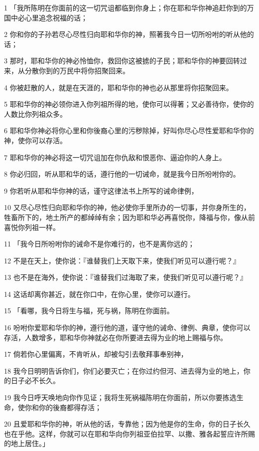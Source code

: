 \par 1 「我所陈明在你面前的这一切咒诅都临到你身上；你在耶和华你神追赶你到的万国中必心里追念祝福的话；
\par 2 你和你的子孙若尽心尽性归向耶和华你的神，照著我今日一切所吩咐的听从他的话；
\par 3 那时，耶和华你的神必怜恤你，救回你这被掳的子民；耶和华你的神要回转过来，从分散你到的万民中将你招聚回来。
\par 4 你被赶散的人，就是在天涯的，耶和华你的神也必从那里将你招聚回来。
\par 5 耶和华你的神必领你进入你列祖所得的地，使你可以得著；又必善待你，使你的人数比你列祖众多。
\par 6 耶和华你神必将你心里和你後裔心里的污秽除掉，好叫你尽心尽性爱耶和华你的神，使你可以存活。
\par 7 耶和华你的神必将这一切咒诅加在你仇敌和恨恶你、逼迫你的人身上。
\par 8 你必归回，听从耶和华的话，遵行他的一切诫命，就是我今日所吩咐你的。
\par 9 你若听从耶和华你神的话，谨守这律法书上所写的诫命律例，
\par 10 又尽心尽性归向耶和华你的神，他必使你手里所办的一切事，并你身所生的，牲畜所下的，地土所产的都绰绰有余；因为耶和华必再喜悦你，降福与你，像从前喜悦你列祖一样。
\par 11 「我今日所吩咐你的诫命不是你难行的，也不是离你远的；
\par 12 不是在天上，使你说：『谁替我们上天取下来，使我们听见可以遵行呢？』
\par 13 也不是在海外，使你说：『谁替我们过海取了来，使我们听见可以遵行呢？』
\par 14 这话却离你甚近，就在你口中，在你心里，使你可以遵行。
\par 15 「看哪，我今日将生与福，死与祸，陈明在你面前。
\par 16 吩咐你爱耶和华你的神，遵行他的道，谨守他的诫命、律例、典章，使你可以存活，人数增多，耶和华你神就必在你所要进去得为业的地上赐福与你。
\par 17 倘若你心里偏离，不肯听从，却被勾引去敬拜事奉别神，
\par 18 我今日明明告诉你们，你们必要灭亡；在你过约但河、进去得为业的地上，你的日子必不长久。
\par 19 我今日呼天唤地向你作见证；我将生死祸福陈明在你面前，所以你要拣选生命，使你和你的後裔都得存活；
\par 20 且爱耶和华你的神，听从他的话，专靠他；因为他是你的生命，你的日子长久也在乎他。这样，你就可以在耶和华向你列祖亚伯拉罕、以撒、雅各起誓应许所赐的地上居住。」

